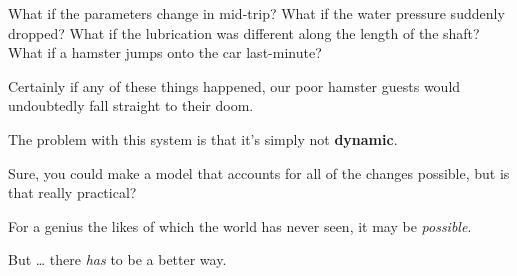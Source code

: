 \documentclass[]{article}
\begin{document}
What if the parameters change in mid-trip? What if the water pressure suddenly dropped? What if the
lubrication was different along the length of the shaft? What if a hamster jumps onto the car
last-minute?

Certainly if any of these things happened, our poor hamster guests would undoubtedly fall straight
to their doom.

The problem with this system is that it's simply not \textbf{dynamic}.

Sure, you could make a model that accounts for all of the changes possible, but is that really
practical?

For a genius the likes of which the world has never seen, it may be \emph{possible}.

But \ldots{} there \emph{has} to be a better way.
\end{document}
